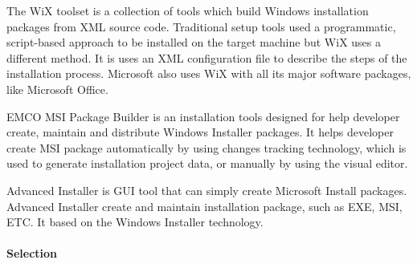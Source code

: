 The WiX toolset is a collection of tools which build Windows installation packages from XML source code.
Traditional setup tools used a programmatic, script-based approach to be installed on the target machine but WiX uses a different method.
It is uses an XML configuration file to describe the steps of the installation process.
Microsoft also uses WiX with all its major software packages, like Microsoft Office.
\cite{Wix_tool}


EMCO MSI Package Builder is an installation tools designed for help developer create, maintain and distribute Windows Installer packages.
\cite{EMCO_MSI}
It helps developer create MSI package automatically by using changes tracking technology, which is used to generate installation project data, or manually by using the visual editor.


Advanced Installer is GUI tool that can simply create Microsoft Install packages.
Advanced Installer create and maintain installation package, such as EXE, MSI, ETC.
It based on the Windows Installer technology.
\cite{advanced_install}

\paragraph{Selection}


